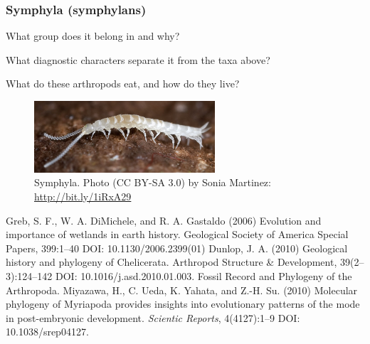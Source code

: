 \documentclass[letterpaper, 11pt]{article}
\begin{document}
\subsubsection*{Symphyla (symphylans)}
What group does it belong in and why?\vspace{1cm}

\noindent{}What diagnostic characters separate it from the taxa above?\vspace{1.5cm}

\noindent{}What do these arthropods eat, and how do they live?\vspace{1.5cm}

\begin{figure}[ht!]
  \centering
    \includegraphics[width=0.6\textwidth]{Symphyla}
  \caption{Symphyla. Photo (CC BY-SA 3.0) by Sonia Martinez: \url{http://bit.ly/1iRxA29}}
  \label{fig:symphyla}
\end{figure}

\begin{thebibliography}{9} %
 Greb, S. F., W. A. DiMichele, and R. A. Gastaldo (2006) Evolution and importance of wetlands in earth history. Geological Society of America Special Papers, 399:1--40 DOI: 10.1130/2006.2399(01)
 Dunlop, J. A. (2010) Geological history and phylogeny of Chelicerata. Arthropod Structure \& Development, 39(2--3):124--142 DOI: 10.1016/j.asd.2010.01.003. Fossil Record and Phylogeny of the Arthropoda.
 Miyazawa, H., C. Ueda, K. Yahata, and Z.-H. Su. (2010) Molecular phylogeny of Myriapoda provides insights into evolutionary patterns of the mode in post-embryonic development. \textit{Scientic Reports}, 4(4127):1--9 DOI: 10.1038/srep04127.
\end{thebibliography}
\end{document}
